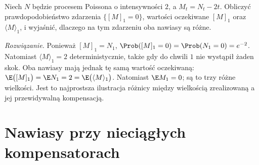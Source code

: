 \begin{zadanie}
Niech $N$ będzie procesem Poissona o intensywności $2$,
a $M_t=N_t-2t$. Obliczyć prawdopodobieństwo zdarzenia
$\{[M]_1=0\}$, wartości oczekiwane $[M]_1$ oraz
$\langle M\rangle_1$, i wyjaśnić, dlaczego na tym
zdarzeniu oba nawiasy są różne.

\emph{Rozwiązanie.} Ponieważ $[M]_1=N_1$,
$\Prob([M]_1=0)=\Prob(N_1=0)=e^{-2}$.
Natomiast $\langle M\rangle_1=2$ deterministycznie,
także gdy do chwili $1$ nie wystąpił żaden skok.
Oba nawiasy mają jednak tę samą wartość oczekiwaną:
$\E\bigl([M]_1\bigr)=\E N_1=2
=\E\bigl(\langle M\rangle_1\bigr)$.
Natomiast $\E M_1=0$; są to trzy różne wielkości.
Jest to najprostsza ilustracja różnicy między wielkością
zrealizowaną a jej przewidywalną kompensacją.
\end{zadanie}


\section{Nawiasy przy nieciągłych kompensatorach}

